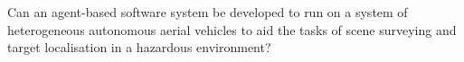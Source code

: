 Can an agent-based software system be developed to run on a system of heterogeneous autonomous aerial vehicles to aid the tasks of scene surveying and target localisation in a hazardous environment? 